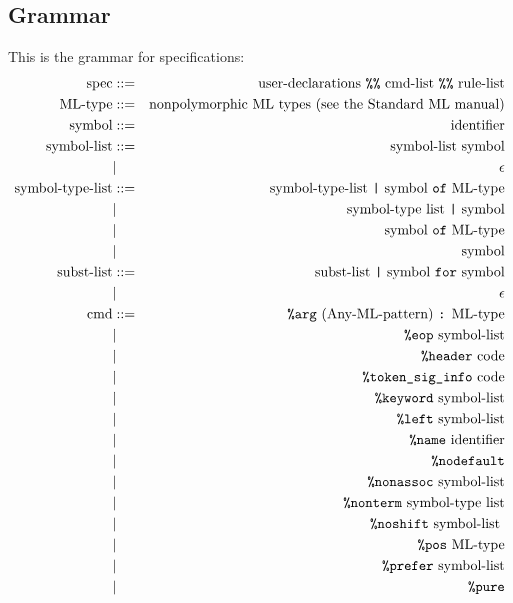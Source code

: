 \subsection{Grammar}

This is the grammar for specifications:
\begin{eqnarray*}
\mbox{spec} & ::= & \mbox{user-declarations {\tt \%\%} cmd-list {\tt \%\%} rule-list} \\
\mbox{ML-type} & ::= & \mbox{nonpolymorphic ML types (see the Standard ML manual)} \\
\mbox{symbol} & ::= & \mbox{identifier} \\
\mbox{symbol-list} & ::= & \mbox{symbol-list symbol} \\
              &  | & \epsilon \\
\mbox{symbol-type-list} & ::= & \mbox{symbol-type-list {\tt |} symbol {\tt of} ML-type} \\
                   & | & \mbox{symbol-type list {\tt |} symbol} \\
                   & | & \mbox{symbol {\tt of} ML-type} \\
                   & | & \mbox{symbol} \\
\mbox{subst-list} & ::= & \mbox{subst-list {\tt |} symbol {\tt for} symbol} \\
             &  |  & \epsilon \\
\mbox{cmd} & ::= & \mbox{{\tt \%arg} (Any-ML-pattern) {\tt :} ML-type} \\
 & | & \mbox{{\tt \%eop} symbol-list} \\
 & | & \mbox{{\tt \%header} code} \\
 & | & \mbox{{\tt \%token\_sig\_info} code} \\
 & | & \mbox{{\tt \%keyword} symbol-list} \\
 & | & \mbox{{\tt \%left} symbol-list} \\
 & | & \mbox{{\tt \%name} identifier} \\
 & | & \mbox{{\tt \%nodefault}} \\
 & | & \mbox{{\tt \%nonassoc} symbol-list} \\
 & | & \mbox{{\tt \%nonterm} symbol-type list} \\
 & | & \mbox{{\tt \%noshift} symbol-list } \\
 & | & \mbox{{\tt \%pos} ML-type} \\
 & | & \mbox{{\tt \%prefer} symbol-list} \\
 & | & \mbox{\tt \%pure} \\

\end{eqnarray*}
